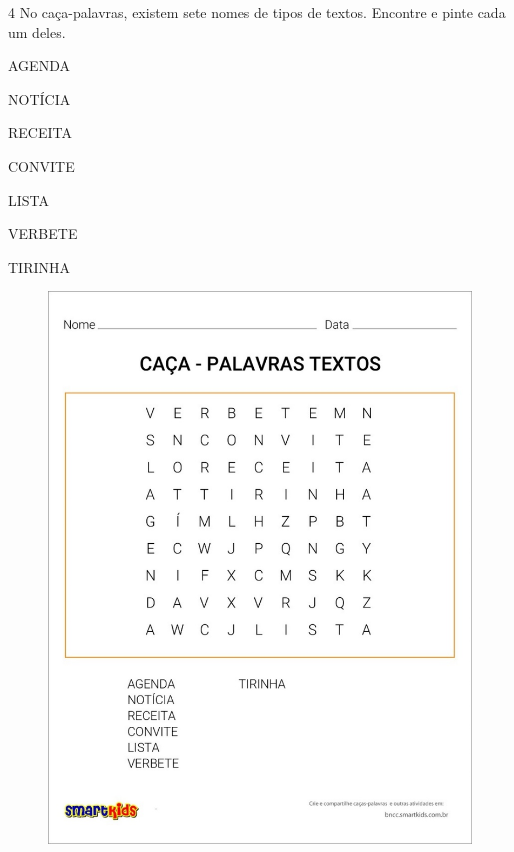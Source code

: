 \pagebreak
\num{4} No caça-palavras, existem sete nomes de tipos de textos. 
Encontre e pinte cada um deles.  

\begin{myquote}
\begin{multicols}{2}
AGENDA

NOTÍCIA

RECEITA

CONVITE

LISTA

VERBETE

TIRINHA
\end{multicols}
\end{myquote}


\begin{figure}[htpb!]
\includegraphics[width=\textwidth]{media/image104.jpeg}
\end{figure}


